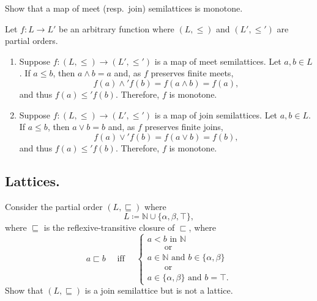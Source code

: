 \documentclass[fontsize=16pt,a4paper,DIV=17,parskip=half]{scrartcl}
\let\mathds\mathbb
\theoremstyle{definition}
\begin{document}
  \begin{que}
    Show that a map of meet (\textup{resp}.\ join) semilattices is monotone.
  \end{que}

  Let $f : L \to L'$ be an arbitrary function where  $(L, \le)$ and $(L', \le')$ are partial orders.

  \begin{enumerate}
    \item Suppose $f : (L, \le) \to (L', \le')$ is a map of meet semilattices.
      Let $a, b \in L$.
      If $a \le b$, then $a \wedge b = a$ and, as $f$ preserves finite meets, \[
      f(a) \wedge' f(b) = f(a \wedge b) = f(a)
      ,\]and thus $f(a) \le' f(b)$.
      Therefore, $f$ is monotone.
    \item Suppose $f : (L, \le) \to (L', \le')$ is a map of join semilattices.
      Let $a, b \in L$.
      If $a \le b$, then $a \vee b = b$ and, as $f$ preserves finite joins, \[
      f(a) \vee' f(b) = f(a \vee b) = f(b)
      ,\]and thus $f(a) \le' f(b)$.
      Therefore, $f$ is monotone.
  \end{enumerate}

  \subsection{Lattices.}

  \begin{que}
    \label{q8}
    Consider the partial order $(L, \sqsubseteq)$ where
    \[
    L \coloneqq \mathds{N} \cup \{\alpha, \beta, \top\} 
    ,\] 
    where $\sqsubseteq$ is the reflexive-transitive closure of $\sqsubset$, where 
    \[
      a \sqsubset b \quad \text{ iff } \quad \begin{cases}
        a < b \text{ in } \mathds{N}\\
        \quad\quad\text{or}\\
        a \in \mathds{N} \text{ and }b \in \{\alpha, \beta\}\\
        \quad\quad\text{or}\\
        a \in \{\alpha, \beta\}  \text{ and } b = \top.
      \end{cases}
    \]
    Show that $(L, \sqsubseteq)$ is a join semilattice but is not a lattice.
  \end{que}
\end{document}
